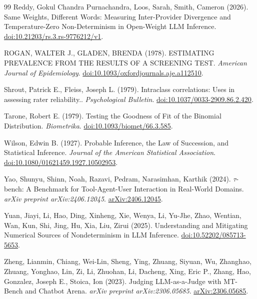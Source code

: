 \documentclass[11pt,letterpaper]{article}
\begin{document}
\begin{thebibliography}{99}
Reddy, Gokul Chandra Purnachandra, Loos, Sarah, Smith, Cameron (2026).
\newblock Same Weights, Different Words: Measuring Inter-Provider Divergence and Temperature-Zero Non-Determinism in Open-Weight LLM Inference.
\newblock \href{https://doi.org/10.21203/rs.3.rs-9776212/v1}{doi:10.21203/rs.3.rs-9776212/v1}.

ROGAN, WALTER J., GLADEN, BRENDA (1978).
\newblock ESTIMATING PREVALENCE FROM THE RESULTS OF A SCREENING TEST.
\newblock \emph{American Journal of Epidemiology}.
\newblock \href{https://doi.org/10.1093/oxfordjournals.aje.a112510}{doi:10.1093/oxfordjournals.aje.a112510}.

Shrout, Patrick E., Fleiss, Joseph L. (1979).
\newblock Intraclass correlations: Uses in assessing rater reliability..
\newblock \emph{Psychological Bulletin}.
\newblock \href{https://doi.org/10.1037/0033-2909.86.2.420}{doi:10.1037/0033-2909.86.2.420}.

Tarone, Robert E. (1979).
\newblock Testing the Goodness of Fit of the Binomial Distribution.
\newblock \emph{Biometrika}.
\newblock \href{https://doi.org/10.1093/biomet/66.3.585}{doi:10.1093/biomet/66.3.585}.

Wilson, Edwin B. (1927).
\newblock Probable Inference, the Law of Succession, and Statistical Inference.
\newblock \emph{Journal of the American Statistical Association}.
\newblock \href{https://doi.org/10.1080/01621459.1927.10502953}{doi:10.1080/01621459.1927.10502953}.

Yao, Shunyu, Shinn, Noah, Razavi, Pedram, Narasimhan, Karthik (2024).
\newblock $\tau$-bench: A Benchmark for Tool-Agent-User Interaction in Real-World Domains.
\newblock \emph{arXiv preprint arXiv:2406.12045}.
\newblock \href{https://arxiv.org/abs/2406.12045}{arXiv:2406.12045}.

Yuan, Jiayi, Li, Hao, Ding, Xinheng, Xie, Wenya, Li, Yu-Jhe, Zhao, Wentian, Wan, Kun, Shi, Jing, Hu, Xia, Liu, Zirui (2025).
\newblock Understanding and Mitigating Numerical Sources of Nondeterminism in LLM Inference.
\newblock \href{https://doi.org/10.52202/085713-5653}{doi:10.52202/085713-5653}.

Zheng, Lianmin, Chiang, Wei-Lin, Sheng, Ying, Zhuang, Siyuan, Wu, Zhanghao, Zhuang, Yonghao, Lin, Zi, Li, Zhuohan, Li, Dacheng, Xing, Eric P., Zhang, Hao, Gonzalez, Joseph E., Stoica, Ion (2023).
\newblock Judging LLM-as-a-Judge with MT-Bench and Chatbot Arena.
\newblock \emph{arXiv preprint arXiv:2306.05685}.
\newblock \href{https://arxiv.org/abs/2306.05685}{arXiv:2306.05685}.

\end{thebibliography}
\end{document}
